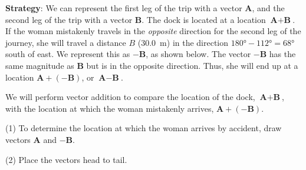 \documentclass[../../main-ap-physics.tex]{subfiles}
\begin{document}
\Solution \textbf{Strategy}: We can represent the first leg of the trip with a vector \textbf{A}, and the second leg of the trip with a vector \textbf{B}. The dock is located at a location $\textbf{A} + \textbf{B}$. If the woman mistakenly travels in the \textit{opposite} direction for the second leg of the journey, she will travel a distance $B$ (\SI{30.0}{m}) in the direction $\ang{180} - \ang{112} = \ang{68}$ south of east. We represent this as $-\textbf{B}$, as shown below. The vector $-\textbf{B}$ has the same magnitude as \textbf{B} but is in the opposite direction. Thus, she will end up at a location $\textbf{A} + \left(-\textbf{B}\right)$, or $\textbf{A} - \textbf{B}$.

\begin{center}
\end{center}

We will perform vector addition to compare the location of the dock, $\textbf{A} + \textbf{B}$, with the location at which the woman mistakenly arrives, $\textbf{A} + \left(-\textbf{B}\right)$.

\vspace{1em}

(1) To determine the location at which the woman arrives by accident, draw vectors $\textbf{A}$ and $-\textbf{B}$.

\vspace{1em}

(2) Place the vectors head to tail.
\end{document}
